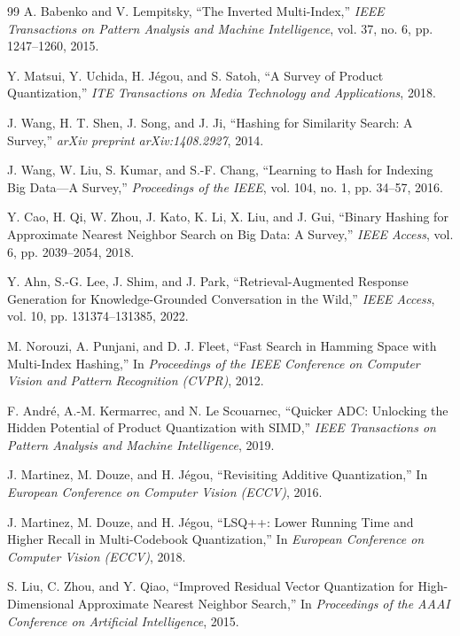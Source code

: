 \documentclass{ieeeaccess}
\begin{document}
\begin{thebibliography}{99}
A. Babenko and V. Lempitsky,
``The Inverted Multi-Index,''
\emph{IEEE Transactions on Pattern Analysis and Machine Intelligence},
vol. 37, no. 6, pp. 1247--1260, 2015.

Y. Matsui, Y. Uchida, H. J\'egou, and S. Satoh,
``A Survey of Product Quantization,''
\emph{ITE Transactions on Media Technology and Applications}, 2018.

J. Wang, H. T. Shen, J. Song, and J. Ji,
``Hashing for Similarity Search: A Survey,''
\emph{arXiv preprint arXiv:1408.2927}, 2014.

J. Wang, W. Liu, S. Kumar, and S.-F. Chang,
``Learning to Hash for Indexing Big Data---A Survey,''
\emph{Proceedings of the IEEE},
vol. 104, no. 1, pp. 34--57, 2016.

Y. Cao, H. Qi, W. Zhou, J. Kato, K. Li, X. Liu, and J. Gui,
``Binary Hashing for Approximate Nearest Neighbor Search on Big Data: A Survey,''
\emph{IEEE Access},
vol. 6, pp. 2039--2054, 2018.

Y. Ahn, S.-G. Lee, J. Shim, and J. Park,
``Retrieval-Augmented Response Generation for Knowledge-Grounded Conversation in the Wild,''
\emph{IEEE Access},
vol. 10, pp. 131374--131385, 2022.

M. Norouzi, A. Punjani, and D. J. Fleet,
``Fast Search in Hamming Space with Multi-Index Hashing,''
In \emph{Proceedings of the IEEE Conference on Computer Vision and Pattern Recognition (CVPR)}, 2012.

F. Andr\'e, A.-M. Kermarrec, and N. Le Scouarnec,
``Quicker ADC: Unlocking the Hidden Potential of Product Quantization with SIMD,''
\emph{IEEE Transactions on Pattern Analysis and Machine Intelligence}, 2019.

J. Martinez, M. Douze, and H. J\'egou,
``Revisiting Additive Quantization,''
In \emph{European Conference on Computer Vision (ECCV)}, 2016.

J. Martinez, M. Douze, and H. J\'egou,
``LSQ++: Lower Running Time and Higher Recall in Multi-Codebook Quantization,''
In \emph{European Conference on Computer Vision (ECCV)}, 2018.

S. Liu, C. Zhou, and Y. Qiao,
``Improved Residual Vector Quantization for High-Dimensional Approximate Nearest Neighbor Search,''
In \emph{Proceedings of the AAAI Conference on Artificial Intelligence}, 2015.


\end{thebibliography}
\end{document}
